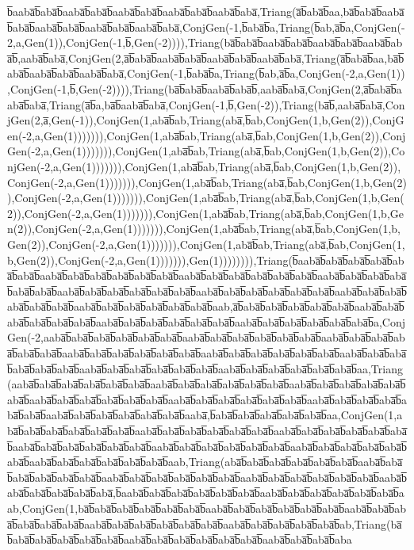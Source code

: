 b̅aaba̅b̅aba̅b̅aaba̅b̅aba̅b̅aaba̅b̅aba̅b̅aaba̅b̅aba̅b̅aaba̅b̅aba̅,Triang(a̅b̅aba̅b̅aa,ba̅b̅aba̅b̅aaba̅b̅aba̅b̅aaba̅b̅aba̅b̅aaba̅b̅aba̅b̅aaba̅b̅aba̅,ConjGen(-1,b̅aba̅b̅a,Triang(b̅ab,a̅b̅a,ConjGen(-2,a,Gen(1)),ConjGen(-1,b̅,Gen(-2)))),Triang(ba̅b̅aba̅b̅aaba̅b̅aba̅b̅aaba̅b̅aba̅b̅aaba̅b̅aba̅b̅,aaba̅b̅aba̅,ConjGen(2,a̅b̅aba̅b̅aaba̅b̅aba̅b̅aaba̅b̅aba̅b̅aaba̅b̅aba̅,Triang(a̅b̅aba̅b̅aa,ba̅b̅aba̅b̅aaba̅b̅aba̅b̅aaba̅b̅aba̅,ConjGen(-1,b̅aba̅b̅a,Triang(b̅ab,a̅b̅a,ConjGen(-2,a,Gen(1)),ConjGen(-1,b̅,Gen(-2)))),Triang(ba̅b̅aba̅b̅aaba̅b̅aba̅b̅,aaba̅b̅aba̅,ConjGen(2,a̅b̅aba̅b̅aaba̅b̅aba̅,Triang(a̅b̅a,ba̅b̅aaba̅b̅aba̅,ConjGen(-1,b̅,Gen(-2)),Triang(ba̅b̅,aaba̅b̅aba̅,ConjGen(2,a̅,Gen(-1)),ConjGen(1,aba̅b̅ab,Triang(aba̅,b̅ab,ConjGen(1,b,Gen(2)),ConjGen(-2,a,Gen(1))))))),ConjGen(1,aba̅b̅ab,Triang(aba̅,b̅ab,ConjGen(1,b,Gen(2)),ConjGen(-2,a,Gen(1))))))),ConjGen(1,aba̅b̅ab,Triang(aba̅,b̅ab,ConjGen(1,b,Gen(2)),ConjGen(-2,a,Gen(1))))))),ConjGen(1,aba̅b̅ab,Triang(aba̅,b̅ab,ConjGen(1,b,Gen(2)),ConjGen(-2,a,Gen(1))))))),ConjGen(1,aba̅b̅ab,Triang(aba̅,b̅ab,ConjGen(1,b,Gen(2)),ConjGen(-2,a,Gen(1))))))),ConjGen(1,aba̅b̅ab,Triang(aba̅,b̅ab,ConjGen(1,b,Gen(2)),ConjGen(-2,a,Gen(1))))))),ConjGen(1,aba̅b̅ab,Triang(aba̅,b̅ab,ConjGen(1,b,Gen(2)),ConjGen(-2,a,Gen(1))))))),ConjGen(1,aba̅b̅ab,Triang(aba̅,b̅ab,ConjGen(1,b,Gen(2)),ConjGen(-2,a,Gen(1))))))),ConjGen(1,aba̅b̅ab,Triang(aba̅,b̅ab,ConjGen(1,b,Gen(2)),ConjGen(-2,a,Gen(1))))))),Gen(1)))))))),Triang(b̅aaba̅b̅aba̅b̅aba̅b̅aba̅b̅aba̅b̅aba̅b̅aaba̅b̅aba̅b̅aba̅b̅aba̅b̅aba̅b̅aba̅b̅aaba̅b̅aba̅b̅aba̅b̅aba̅b̅aba̅b̅aba̅b̅aaba̅b̅aba̅b̅aba̅b̅aba̅b̅aba̅b̅aba̅b̅aaba̅b̅aba̅b̅aba̅b̅aba̅b̅aba̅b̅aba̅b̅aaba̅b̅aba̅b̅aba̅b̅aba̅b̅aba̅b̅aba̅b̅aaba̅b̅aba̅b̅aba̅b̅aba̅b̅aba̅b̅aba̅b̅aaba̅b̅aba̅b̅aba̅b̅aba̅b̅aba̅b̅aba̅b̅aab,a̅b̅aba̅b̅aba̅b̅aba̅b̅aba̅b̅aba̅b̅aaba̅b̅aba̅b̅aba̅b̅aba̅b̅aba̅b̅aba̅b̅aaba̅b̅aba̅b̅aba̅b̅aba̅b̅aba̅b̅aba̅b̅aaba̅b̅aba̅b̅aba̅b̅aba̅b̅aba̅b̅aba̅b̅a,ConjGen(-2,aaba̅b̅aba̅b̅aba̅b̅aba̅b̅aba̅b̅aba̅b̅aaba̅b̅aba̅b̅aba̅b̅aba̅b̅aba̅b̅aba̅b̅aaba̅b̅aba̅b̅aba̅b̅aba̅b̅aba̅b̅aba̅b̅aaba̅b̅aba̅b̅aba̅b̅aba̅b̅aba̅b̅aba̅b̅aaba̅b̅aba̅b̅aba̅b̅aba̅b̅aba̅b̅aba̅b̅aaba̅b̅aba̅b̅aba̅b̅aba̅b̅aba̅b̅aba̅b̅aaba̅b̅aba̅b̅aba̅b̅aba̅b̅aba̅b̅aba̅b̅aaba̅b̅aba̅b̅aba̅b̅aba̅b̅aba̅b̅aba̅b̅aa,Triang(aaba̅b̅aba̅b̅aba̅b̅aba̅b̅aba̅b̅aba̅b̅aaba̅b̅aba̅b̅aba̅b̅aba̅b̅aba̅b̅aba̅b̅aaba̅b̅aba̅b̅aba̅b̅aba̅b̅aba̅b̅aba̅b̅aaba̅b̅aba̅b̅aba̅b̅aba̅b̅aba̅b̅aba̅b̅aaba̅b̅aba̅b̅aba̅b̅aba̅b̅aba̅b̅aba̅b̅aaba̅b̅aba̅b̅aba̅b̅aba̅b̅aba̅b̅aba̅b̅aaba̅b̅aba̅b̅aba̅b̅aba̅b̅aba̅b̅aba̅b̅aaba̅,b̅aba̅b̅aba̅b̅aba̅b̅aba̅b̅aba̅b̅aa,ConjGen(1,aba̅b̅aba̅b̅aba̅b̅aba̅b̅aba̅b̅aba̅b̅aaba̅b̅aba̅b̅aba̅b̅aba̅b̅aba̅b̅aba̅b̅aaba̅b̅aba̅b̅aba̅b̅aba̅b̅aba̅b̅aba̅b̅aaba̅b̅aba̅b̅aba̅b̅aba̅b̅aba̅b̅aba̅b̅aaba̅b̅aba̅b̅aba̅b̅aba̅b̅aba̅b̅aba̅b̅aaba̅b̅aba̅b̅aba̅b̅aba̅b̅aba̅b̅aba̅b̅aaba̅b̅aba̅b̅aba̅b̅aba̅b̅aba̅b̅aba̅b̅aab,Triang(aba̅b̅aba̅b̅aba̅b̅aba̅b̅aba̅b̅aba̅b̅aaba̅b̅aba̅b̅aba̅b̅aba̅b̅aba̅b̅aba̅b̅aaba̅b̅aba̅b̅aba̅b̅aba̅b̅aba̅b̅aba̅b̅aaba̅b̅aba̅b̅aba̅b̅aba̅b̅aba̅b̅aba̅b̅aaba̅b̅aba̅b̅aba̅b̅aba̅b̅aba̅b̅aba̅,b̅aaba̅b̅aba̅b̅aba̅b̅aba̅b̅aba̅b̅aba̅b̅aaba̅b̅aba̅b̅aba̅b̅aba̅b̅aba̅b̅aba̅b̅aab,ConjGen(1,ba̅b̅aba̅b̅aba̅b̅aba̅b̅aba̅b̅aba̅b̅aaba̅b̅aba̅b̅aba̅b̅aba̅b̅aba̅b̅aba̅b̅aaba̅b̅aba̅b̅aba̅b̅aba̅b̅aba̅b̅aba̅b̅aaba̅b̅aba̅b̅aba̅b̅aba̅b̅aba̅b̅aba̅b̅aaba̅b̅aba̅b̅aba̅b̅aba̅b̅aba̅b̅ab,Triang(ba̅b̅aba̅b̅aba̅b̅aba̅b̅aba̅b̅aba̅b̅aaba̅b̅aba̅b̅aba̅b̅aba̅b̅aba̅b̅aba̅b̅aaba̅b̅aba̅b̅aba̅b̅aba